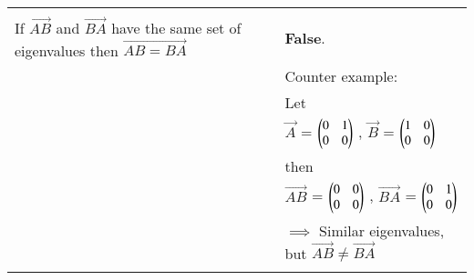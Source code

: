 \documentclass[journal,12pt,twocolumn]{IEEEtran}
\newcommand\myemptypage{
	\null
	\thispagestyle{empty}
	\addtocounter{page}{-1}
	\newpage
}
\begin{document}
\begin{table}[h]
\begin{tabular}{|m{3cm}|m{14cm}|}
		& \\
		\hline
		&\\
		If $\vec{AB}$ and $\vec{BA}$ have the same set of eigenvalues then $\vec{AB=BA}$
		& \textbf{False}. \\
		&Counter example:\\
		& Let\\
		& \qquad\qquad\qquad$\vec{A}$ = $\begin{pmatrix}0 & 1 \\ 0 & 0\end{pmatrix}$ , 
	     $\vec{B}$ = $\begin{pmatrix}1 & 0 \\ 0 & 0\end{pmatrix}$\\
	    &then\\
	    & \qquad\qquad\qquad$\vec{AB}$ = $\begin{pmatrix}0 & 0 \\ 0 & 0\end{pmatrix}$ ,  $\vec{BA}$ = $\begin{pmatrix}0 & 1 \\ 0 & 0\end{pmatrix}$\\
        & $\implies$ Similar eigenvalues, but $\vec{AB} \ne \vec{BA}$
		\\
		&\\
		\hline
			\end{tabular}
	\end{table}
\pagebreak
\myemptypage
\end{document}
